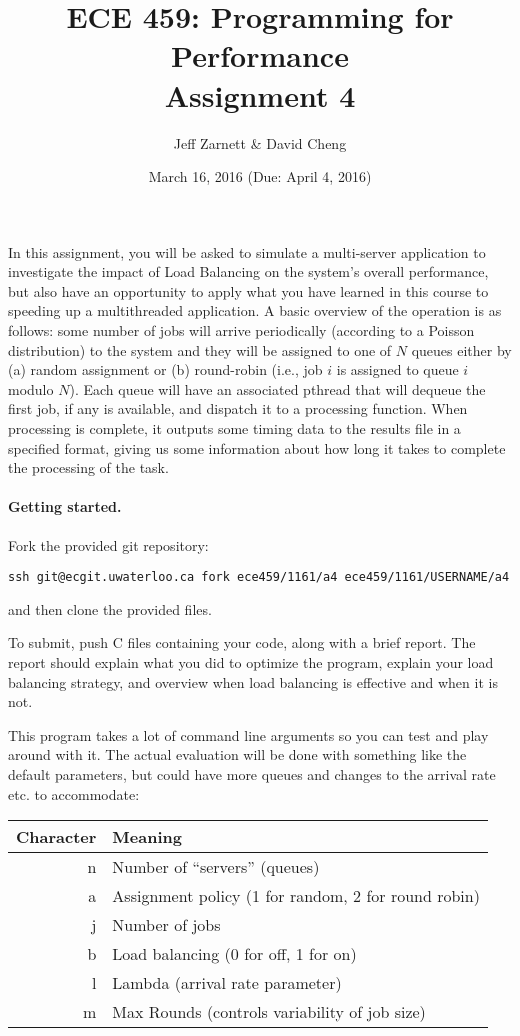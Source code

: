 \documentclass[letterpaper,10pt]{article}
\title{\bf ECE 459: Programming for Performance\\Assignment 4}
\author{Jeff Zarnett \& David Cheng}
\date{March 16, 2016 (Due: April 4, 2016)}
\begin{document}
\maketitle

In this assignment, you will be asked to simulate a multi-server application to investigate the impact of Load Balancing on the system's overall performance, but also have an opportunity to apply what you have learned in this course to speeding up a multithreaded application. A basic overview of the operation is as follows: some number of jobs will arrive periodically (according to a Poisson distribution) to the system and they will be assigned to one of $N$ queues either by (a) random assignment or (b) round-robin (i.e., job $i$ is assigned to queue $i$ modulo $N$). Each queue will have an associated pthread that will dequeue the first job, if any is available, and dispatch it to a processing function. When processing is complete, it outputs some timing data to the results file in a specified format, giving us some information about how long it takes to complete the processing of the task.


\paragraph{Getting started.} Fork the provided git repository:
\begin{center}
{\tt ssh git@ecgit.uwaterloo.ca fork ece459/1161/a4 ece459/1161/USERNAME/a4}
\end{center}
\noindent and then clone the provided files.

To submit, push C files containing your code, along with a brief report. The report should explain what you did to optimize the program, explain your load balancing strategy, and overview when load balancing is effective and when it is not.

This program takes a lot of command line arguments so you can test and play around with it. The actual evaluation will be done with something like the default parameters, but could have more queues and changes to the arrival rate etc. to accommodate:

\begin{center}
	\begin{tabular}{r|l}
	\textbf{Character} & \textbf{Meaning} \\ \hline
	n & Number of ``servers'' (queues) \\
	a & Assignment policy (1 for random, 2 for round robin) \\
	j & Number of jobs \\
	b & Load balancing (0 for off, 1 for on) \\
	l & Lambda (arrival rate parameter) \\
	m & Max Rounds (controls variability of job size) \\
	\end{tabular}
\end{center}
\end{document}
